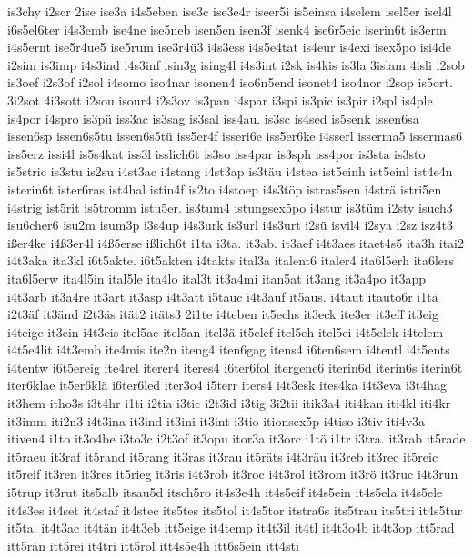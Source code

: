 {is3chy
i2scr
2ise
ise3a
i4s5eben
ise3c
ise3e4r
iseer5i
is5einsa
i4selem
isel5er
isel4l
i6s5el6ter
i4s3emb
ise4ne
ise5neb
isen5en
isen3f
isenk4
ise6r5eic
iserin6t
is3erm
i4s5ernt
ise5r4ue5
ise5rum
ise3r4ü3
i4s3ess
i4s5e4tat
is4eur
is4exi
isex5po
isi4de
i2sim
is3imp
i4s3ind
i4s3inf
isin3g
ising4l
i4s3int
i2sk
is4kis
is3la
3islam
4isli
i2sob
is3oef
i2s3of
i2sol
i4somo
iso4nar
isonen4
iso6n5end
isonet4
iso4nor
i2sop
is5ort.
3i2sot
4i3sott
i2sou
isour4
i2s3ov
is3pan
i4spar
i3spi
is3pic
is3pir
i2spl
is4ple
is4por
i4spro
is3pü
iss3ac
is3sag
is3sal
iss4au.
is3sc
is4sed
is5senk
issen6sa
issen6sp
issen6s5tu
issen6s5tü
iss5er4f
isseri6e
iss5er6ke
i4sserl
isserma5
issermas6
iss5erz
issi4l
is5s4kat
iss3l
isslich6t
is3so
iss4par
is3sph
iss4por
is3sta
is3sto
is5stric
is3stu
is2su
i4st3ac
i4stang
i4st3ap
is3täu
i4stea
ist5einh
ist5einl
ist4e4n
isterin6t
ister6ras
ist4hal
istin4f
is2to
i4stoep
i4s3töp
istras5sen
i4strä
istri5en
i4strig
ist5rit
is5tromm
istu5er.
is3tum4
istungsex5po
i4stur
is3tüm
i2sty
isuch3
isu6cher6
isu2m
isum3p
i3s4up
i4s3urk
is3url
i4s3urt
i2sü
isvil4
i2sya
i2sz
isz4t3
ißer4ke
i4ß3er4l
i4ß5erse
ißlich6t
i1ta
i3ta.
it3ab.
it3aef
i4t3aes
itaet4s5
ita3h
itai2
i4t3aka
ita3kl
i6t5akte.
i6t5akten
i4takts
ital3a
italent6
italer4
ita6l5erh
ita6lers
ita6l5erw
ita4l5in
ital5le
ita4lo
ital3t
it3a4mi
itan5at
it3ang
it3a4po
it3app
i4t3arb
it3a4re
it3art
it3asp
i4t3att
i5tauc
i4t3auf
it5aus.
i4taut
itauto6r
i1tä
i2t3äf
it3änd
i2t3äs
ität2
itäts3
2i1te
i4teben
it5echs
it3eck
ite3er
it3eff
it3eig
i4teige
it3ein
i4t3eis
itel5ae
itel5an
itel3ä
it5elef
itel5eh
itel5ei
i4t5elek
i4telem
i4t5e4lit
i4t3emb
ite4mis
ite2n
iteng4
iten6gag
itens4
i6ten6sem
i4tentl
i4t5ents
i4tentw
i6t5ereig
ite4rel
iterer4
iteres4
i6ter6fol
itergene6
iterin6d
iterin6s
iterin6t
iter6klae
it5er6klä
i6ter6led
iter3o4
i5terr
iters4
i4t3esk
ites4ka
i4t3eva
i3t4hag
it3hem
itho3s
i3t4hr
i1ti
i2tia
i3tic
i2t3id
i3tig
3i2tii
itik3a4
iti4kan
iti4kl
iti4kr
it3imm
iti2n3
i4t3ina
it3ind
it3ini
it3int
i3tio
itionsex5p
i4tiso
i3tiv
iti4v3a
itiven4
i1to
it3o4be
i3to3c
i2t3of
it3opu
itor3a
it3orc
i1tö
i1tr
i3tra.
it3rab
it5rade
it5raeu
it3raf
it5rand
it5rang
it3ras
it3rau
it5räts
i4t3räu
it3reb
it3rec
it5reic
it5reif
it3ren
it3res
it5rieg
it3ris
i4t3rob
it3roc
i4t3rol
it3rom
it3rö
it3ruc
i4t3run
i5trup
it3rut
its5alb
itsau5d
itsch5ro
it4s3e4h
it4s5eif
it4s5ein
it4s5ela
it4s5ele
it4s3es
it4set
it4staf
it4stec
its5tes
its5tol
it4s5tor
itstra6s
its5trau
its5tri
it4s5tur
it5ta.
it4t3ac
it4tän
it4t3eb
itt5eige
it4temp
it4t3il
it4tl
it4t3o4b
it4t3op
itt5rad
itt5rän
itt5rei
it4tri
itt5rol
itt4s5e4h
itt6s5ein
itt4sti
}
